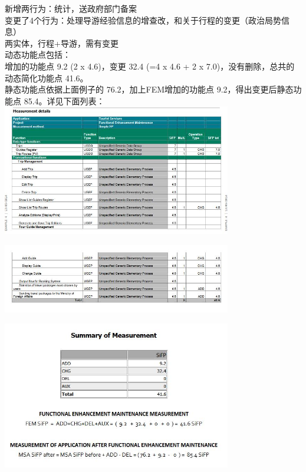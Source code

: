 新增两行为：统计，送政府部门备案\\
变更了4个行为：处理导游经验信息的增查改，和关于行程的变更（政治局势信息）\\
两实体，行程+导游，需有变更\\

动态功能点包括：\\
增加的功能点 9.2 (2 x 4.6)，变更 32.4 (=4 x 4.6 + 2 x 7.0)，没有删除，总共的动态简化功能点 41.6。\\

静态功能点依据上面例子的 76.2，加上FEM增加的功能点 9.2，得出变更后静态功能点 85.4。详见下面列表： \\



\includegraphics[width=10cm]{微信截图_20220325124602.jpg}


\includegraphics[width=10cm]{微信截图_20220325124630.jpg}

\includegraphics[width=10cm]{微信截图_20220325124706.jpg}






